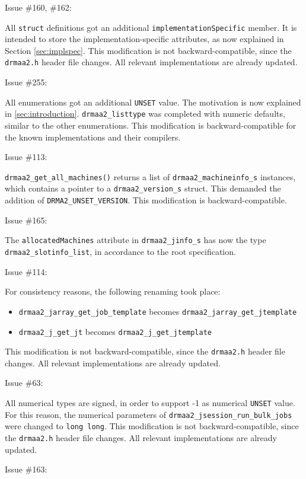 \documentclass{article}
\newcommand{\h}[1]{\texttt{#1}}
\begin{document}
Issue \#160, \#162:

All \h{struct} definitions got an additional \h{implementationSpecific} member. It is intended to store the implementation-specific attributes, as now explained in Section \ref{sec:implspec}. This modification is not backward-compatible, since the \h{drmaa2.h} header file changes. All relevant implementations are already updated.

Issue \#255:

All enumerations got an additional \h{UNSET} value. The motivation is now explained in \ref{sec:introduction}. \h{drmaa2\_listtype} was completed with numeric defaults, similar to the other enumerations. This modification is backward-compatible for the known implementations and their compilers.

Issue \#113:

\h{drmaa2\_get\_all\_machines()} returns a list of \h{drmaa2\_machineinfo\_s} instances, which contains a pointer to a \h{drmaa2\_version\_s} struct. This demanded the addition of \h{DRMA2\_UNSET\_VERSION}. This modification is backward-compatible.

Issue \#165:

The \h{allocatedMachines} attribute in \h{drmaa2\_jinfo\_s} has now the type \h{drmaa2\_slotinfo\_list}, in accordance to the root specification.

Issue \#114:

For consistency reasons, the following renaming took place:

\begin{itemize}
	\item \h{drmaa2\_jarray\_get\_job\_template} becomes \h{drmaa2\_jarray\_get\_jtemplate}
	\item \h{drmaa2\_j\_get\_jt} becomes \h{drmaa2\_j\_get\_jtemplate}
\end{itemize}

This modification is not backward-compatible, since the \h{drmaa2.h} header file changes. All relevant implementations are already updated.

Issue \#63:

All numerical types are signed, in order to support -1 as numerical \h{UNSET} value. For this reason, the numerical parameters of \h{drmaa2\_jsession\_run\_bulk\_jobs} were changed to \h{long long}. This modification is not backward-compatible, since the \h{drmaa2.h} header file changes. All relevant implementations are already updated.

Issue \#163:
\end{document}
